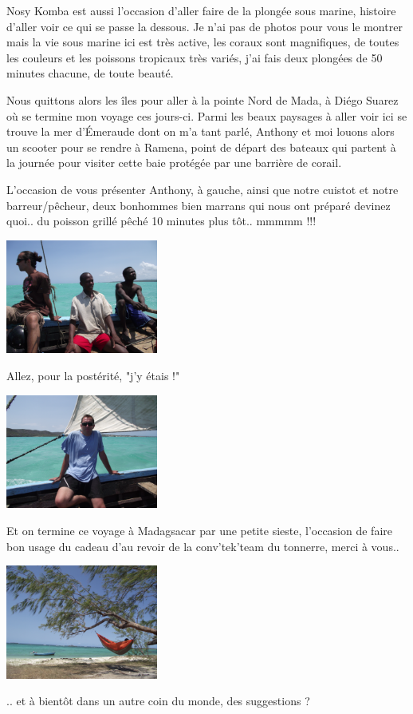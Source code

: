 \begin{multicols}{2}
Nosy Komba est aussi l'occasion d'aller faire de la plongée sous marine, histoire d'aller voir ce qui se passe la dessous. Je n'ai pas de photos pour vous le montrer mais la vie sous marine ici est très active, les coraux sont magnifiques, de toutes les couleurs et les poissons tropicaux très variés, j'ai fais deux plongées de 50 minutes chacune, de toute beauté.

Nous quittons alors les îles pour aller à la pointe Nord de Mada, à Diégo Suarez où se termine mon voyage ces jours-ci. Parmi les beaux paysages à aller voir ici se trouve la mer d'Émeraude dont on m'a tant parlé, Anthony et moi louons alors un scooter pour se rendre à Ramena, point de départ des bateaux qui partent à la journée pour visiter cette baie protégée par une barrière de corail.

L'occasion de vous présenter Anthony, à gauche, ainsi que notre cuistot et notre barreur/pêcheur, deux bonhommes bien marrans qui nous ont préparé devinez quoi.. du poisson grillé pêché 10 minutes plus tôt.. mmmmm !!!

\smallbreak\smallbreak
\hspace*{-0.65cm}
\includegraphics[width=5cm]{articles/Une-boucle-du-cote-vert/DSCF0456.JPG}
\smallbreak

Allez, pour la postérité, "j'y étais !"

\smallbreak\smallbreak
\hspace*{-0.65cm}
\includegraphics[width=5cm]{articles/Une-boucle-du-cote-vert/DSCF0457.JPG}
\smallbreak

Et on termine ce voyage à Madagsacar par une petite sieste, l'occasion de faire bon usage du cadeau d'au revoir de la conv'tek'team du tonnerre, merci à vous..

\smallbreak\smallbreak
\hspace*{-0.65cm}
\includegraphics[width=5cm]{articles/Une-boucle-du-cote-vert/DSCF0463.JPG}
\smallbreak

.. et à bientôt dans un autre coin du monde, des suggestions ?

\end{multicols}


